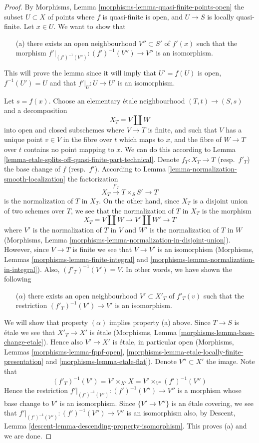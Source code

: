 \begin{proof}
By Morphisms, Lemma \ref{morphisms-lemma-quasi-finite-points-open}
the subset $U \subset X$ of points where $f$ is quasi-finite is open,
and $U \to S$ is locally quasi-finite. Let $x \in U$.
We want to show that
\begin{enumerate}
\item[(a)] there exists an open neighbourhood $V'' \subset S'$
of $f'(x)$ such that the morphism
$f'|_{(f')^{-1}(V'')} : (f')^{-1}(V'') \to V''$ is an isomorphism.
\end{enumerate}
This will prove the lemma since it will imply that $U' = f(U)$
is open, $f^{-1}(U') = U$ and that $f'|_U : U \to U'$ is an isomorphism.

\medskip\noindent
Let $s = f(x)$. Choose an elementary \'etale neighbourhood $(T, t) \to (S, s)$
and a decomposition
$$
X_T = V \coprod W
$$
into open and closed subschemes where $V \to T$ is finite, and such that
$V$ has a unique point $v \in V$ in the fibre over $t$ which maps to $x$,
and the fibre of $W \to T$ over $t$ contains no point mapping to $x$.
We can do this according to
Lemma \ref{lemma-etale-splits-off-quasi-finite-part-technical}.
Denote $f_T : X_T \to T$ (resp.\ $f'_T$) the base change of $f$
(resp.\ $f'$). According to
Lemma \ref{lemma-normalization-smooth-localization} the factorization
$$
X_T \xrightarrow{f'_T} T \times_S S' \longrightarrow T
$$
is the normalization of $T$ in $X_T$. On the other hand, since $X_T$
is a disjoint union of two schemes over $T$, we see that the normalization
of $T$ in $X_T$ is the morphism
$$
X_T = V \coprod W \longrightarrow V' \coprod W' \longrightarrow T
$$
where $V'$ is the normalization of $T$ in $V$ and $W'$ is the normalization
of $T$ in $W$
(Morphisms, Lemma \ref{morphisms-lemma-normalization-in-disjoint-union}).
However, since $V \to T$ is finite we see that $V \to V'$ is an isomorphism
(Morphisms, Lemmas \ref{morphisms-lemma-finite-integral}
and \ref{morphisms-lemma-normalization-in-integral}).
Also, $(f'_T)^{-1}(V') = V$. In other words, we have shown the following
\begin{enumerate}
\item[($\alpha$)] there exists an open neighbourhood $V' \subset X'_T$
of $f'_T(v)$ such that the restriction
$(f'_T)^{-1}(V') \to V'$ is an isomorphism.
\end{enumerate}
We will show that property $(\alpha)$ implies property (a) above.
Since $T \to S$ is \'etale we see that $X'_T \to X'$ is \'etale
(Morphisms, Lemma \ref{morphisms-lemma-base-change-etale}).
Hence also $V' \to X'$ is \'etale, in particular open
(Morphisms, Lemmas \ref{morphisms-lemma-fppf-open},
\ref{morphisms-lemma-etale-locally-finite-presentation}
and \ref{morphisms-lemma-etale-flat}). Denote
$V'' \subset X'$ the image. Note that
$$
(f'_T)^{-1}(V') = V' \times_{X'} X = V' \times_{V''} (f')^{-1}(V'')
$$
Hence the restriction $f'|_{(f')^{-1}(V'')} : (f')^{-1}(V'') \to V''$
is a morphism whose base change to $V'$ is an isomorphism. Since
$\{V' \to V''\}$ is an \'etale covering, we see that
$f'|_{(f')^{-1}(V'')} : (f')^{-1}(V'') \to V''$ is an isomorphism also,
by Descent, Lemma \ref{descent-lemma-descending-property-isomorphism}.
This proves (a) and we are done.
\end{proof}

